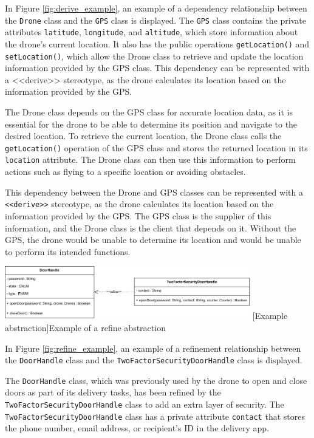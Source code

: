 \documentclass[
	12pt,
    a4paper,
    egregdoesnotlikesansseriftitles, %
    toc=chapterentrywithdots,
    oneside, openany,
    titlepage,
    parskip=half,
    headings=normal,  %
    listof=totoc,
    bibliography=totocnumbered,
    index=totoc,
    captions=tableheading,  %
    listof=flat,
    numbers=noenddot, %
    final]
    {scrbook}
\begin{document}
In Figure \ref{fig:derive_example}, an example of a dependency relationship between the \texttt{Drone} class and the \texttt{GPS} class is displayed. 
The \texttt{GPS} class contains the private attributes \texttt{latitude}, \texttt{longitude}, and \texttt{altitude}, which store information about the drone's current location. It also has the public operations \texttt{getLocation()} and \texttt{setLocation()}, which allow the Drone class to retrieve and update the location information provided by the GPS class.
This dependency can be represented with a <<derive>> stereotype, as the drone calculates its location based on the information provided by the GPS.

The Drone class depends on the GPS class for accurate location data, as it is essential for the drone to be able to determine its position and navigate to the desired location. To retrieve the current location, the Drone class calls the \texttt{getLocation()} operation of the GPS class and stores the returned location in its \texttt{location} attribute. The Drone class can then use this information to perform actions such as flying to a specific location or avoiding obstacles.

This dependency between the Drone and GPS classes can be represented with a \texttt{<<derive>>} stereotype, as the drone calculates its location based on the information provided by the GPS. 
The GPS class is the supplier of this information, and the Drone class is the client that depends on it. 
Without the GPS, the drone would be unable to determine its location and would be unable to perform its intended functions.

\vspace{1em}
\begin{minipage}{\linewidth}
	\centering
	\includegraphics[width=0.8\textwidth]{figures/dependencies/refine.jpg}
	[Example abstraction]{Example of a refine abstraction}
	\label{fig:refine_example}
\end{minipage}

In Figure \ref{fig:refine_example}, an example of a refinement relationship between the \texttt{DoorHandle} class and the \texttt{TwoFactorSecurityDoorHandle} class is displayed.

The \texttt{DoorHandle} class, which was previously used by the drone to open and close doors as part of its delivery tasks, has been refined by the \texttt{TwoFactorSecurityDoorHandle} class to add an extra layer of security. The \texttt{TwoFactorSecurityDoorHandle} class has a private attribute \texttt{contact} that stores the phone number, email address, or recipient's ID in the delivery app.
\end{document}

